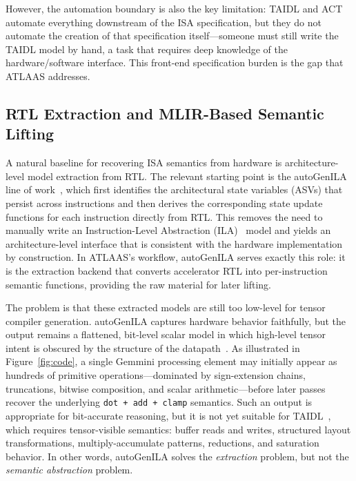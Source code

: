However, the automation boundary is also the key limitation: TAIDL and ACT automate everything downstream of the ISA specification, but they do not automate the creation of that specification itself---someone must still write the TAIDL model by hand, a task that requires deep knowledge of the hardware/software interface. This front-end specification burden is the gap that ATLAAS addresses.

\subsection{RTL Extraction and MLIR-Based Semantic Lifting}
\label{subsec:rtl-extraction}

A natural baseline for recovering ISA semantics from hardware is architecture-level model extraction from RTL.
The relevant starting point is the autoGenILA line of work~\cite{autogenilaiccad, autogeniladate}, which first identifies the architectural state variables (ASVs) that persist across instructions and then derives the corresponding state update functions for each instruction directly from RTL.
This removes the need to manually write an Instruction-Level Abstraction (ILA)~\cite{ila} model and yields an architecture-level interface that is consistent with the hardware implementation by construction.
In ATLAAS's workflow, autoGenILA serves exactly this role: it is the extraction backend that converts accelerator RTL into per-instruction semantic functions, providing the raw material for later lifting.

The problem is that these extracted models are still too low-level for tensor compiler generation.
autoGenILA captures hardware behavior faithfully, but the output remains a flattened, bit-level scalar model in which high-level tensor intent is obscured by the structure of the datapath~\cite{autogenilaiccad, autogeniladate}.
As illustrated in Figure~\ref{fig:code}, a single Gemmini processing element may initially appear as hundreds of primitive operations---dominated by sign-extension chains, truncations, bitwise composition, and scalar arithmetic---before later passes recover the underlying \texttt{dot\,+\,add\,+\,clamp} semantics.
Such an output is appropriate for bit-accurate reasoning, but it is not yet suitable for TAIDL~\cite{taidl-micro2025}, which requires tensor-visible semantics: buffer reads and writes, structured layout transformations, multiply-accumulate patterns, reductions, and saturation behavior.
In other words, autoGenILA solves the \emph{extraction} problem, but not the \emph{semantic abstraction} problem.

